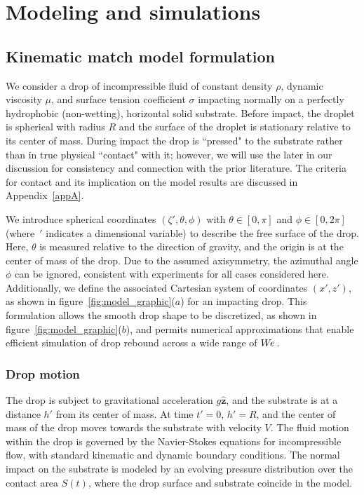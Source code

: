 \documentclass{jfm}
\newcommand{\We}{W\kern-0.15em e\,}
\begin{document}
\section{Modeling and simulations} \label{sec:modelingandsimulations}


\subsection{Kinematic match model formulation} \label{subsec:Formulation}

We consider a drop of incompressible fluid of constant density $\rho$, dynamic viscosity $\mu$, and surface tension coefficient $\sigma$ impacting normally on a perfectly hydrophobic (non-wetting), horizontal solid substrate. Before impact, the droplet is spherical with radius $R$ and the surface of the droplet is stationary relative to its center of mass. During impact the drop is ``pressed" to the substrate rather than in true physical ``contact" with it; however, we will use the later in our discussion for consistency and connection with the prior literature. The criteria for contact and its implication on the model results are discussed in Appendix~\ref{appA}.

We introduce spherical coordinates $(\zeta',\theta,\phi)$ with $\theta\in\left[0,\pi\right]$ and $\phi\in\left[0,2\pi\right]$ (where~$'$ indicates a dimensional variable) to describe the free surface of the drop. Here, $\theta$ is measured relative to the direction of gravity, and the origin is at the center of mass of the drop. Due to the assumed axisymmetry, the azimuthal angle $\phi$ can be ignored, consistent with experiments for all cases considered here. Additionally, we define the associated Cartesian system of coordinates $(x',z')$, as shown in figure~\ref{fig:model_graphic}($a$) for an impacting drop. This formulation allows the smooth drop shape to be discretized, as shown in figure~\ref{fig:model_graphic}($b$), and permits numerical approximations that enable efficient simulation of drop rebound across a wide range of $\We$.


\subsubsection{Drop motion} \label{subsubsec:dropmotion}

 The drop is subject to gravitational acceleration $g\mathbf{ \hat{z}}$, and the substrate is at a distance $h'$ from its center of mass. At time $t'=0$, $h'=R$, and the center of mass of the drop moves towards the substrate with velocity $V$. The fluid motion within the drop is governed by the Navier-Stokes equations for incompressible flow, with standard kinematic and dynamic boundary conditions. The normal impact on the substrate is modeled by an evolving pressure distribution over the contact area $S \left( t \right)$, where the drop surface and substrate coincide in the model.
 
\end{document}

